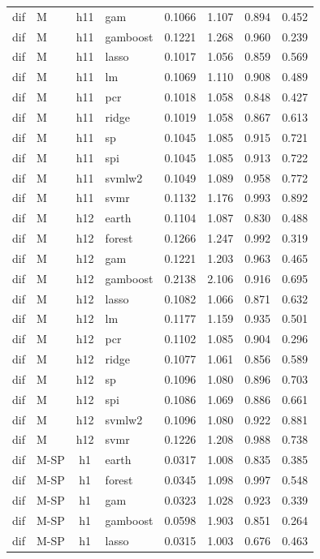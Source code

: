 \begin{ThreePartTable}
\begin{longtable}[t]{llclcccc}
dif & M & h11 & gam & 0.1066 & 1.107 & 0.894 & 0.452\\
dif & M & h11 & gamboost & 0.1221 & 1.268 & 0.960 & 0.239\\
dif & M & h11 & lasso & 0.1017 & 1.056 & 0.859 & 0.569\\
dif & M & h11 & lm & 0.1069 & 1.110 & 0.908 & 0.489\\
dif & M & h11 & pcr & 0.1018 & 1.058 & 0.848 & 0.427\\
dif & M & h11 & ridge & 0.1019 & 1.058 & 0.867 & 0.613\\
dif & M & h11 & sp & 0.1045 & 1.085 & 0.915 & 0.721\\
dif & M & h11 & spi & 0.1045 & 1.085 & 0.913 & 0.722\\
dif & M & h11 & svmlw2 & 0.1049 & 1.089 & 0.958 & 0.772\\
dif & M & h11 & svmr & 0.1132 & 1.176 & 0.993 & 0.892\\
\addlinespace
dif & M & h12 & earth & 0.1104 & 1.087 & 0.830 & 0.488\\
dif & M & h12 & forest & 0.1266 & 1.247 & 0.992 & 0.319\\
dif & M & h12 & gam & 0.1221 & 1.203 & 0.963 & 0.465\\
dif & M & h12 & gamboost & 0.2138 & 2.106 & 0.916 & 0.695\\
dif & M & h12 & lasso & 0.1082 & 1.066 & 0.871 & 0.632\\
dif & M & h12 & lm & 0.1177 & 1.159 & 0.935 & 0.501\\
dif & M & h12 & pcr & 0.1102 & 1.085 & 0.904 & 0.296\\
dif & M & h12 & ridge & 0.1077 & 1.061 & 0.856 & 0.589\\
dif & M & h12 & sp & 0.1096 & 1.080 & 0.896 & 0.703\\
dif & M & h12 & spi & 0.1086 & 1.069 & 0.886 & 0.661\\
dif & M & h12 & svmlw2 & 0.1096 & 1.080 & 0.922 & 0.881\\
dif & M & h12 & svmr & 0.1226 & 1.208 & 0.988 & 0.738\\
\addlinespace
dif & M-SP & h1 & earth & 0.0317 & 1.008 & 0.835 & 0.385\\
dif & M-SP & h1 & forest & 0.0345 & 1.098 & 0.997 & 0.548\\
dif & M-SP & h1 & gam & 0.0323 & 1.028 & 0.923 & 0.339\\
dif & M-SP & h1 & gamboost & 0.0598 & 1.903 & 0.851 & 0.264\\
dif & M-SP & h1 & lasso & 0.0315 & 1.003 & 0.676 & 0.463\\

\end{longtable}
\end{ThreePartTable}
